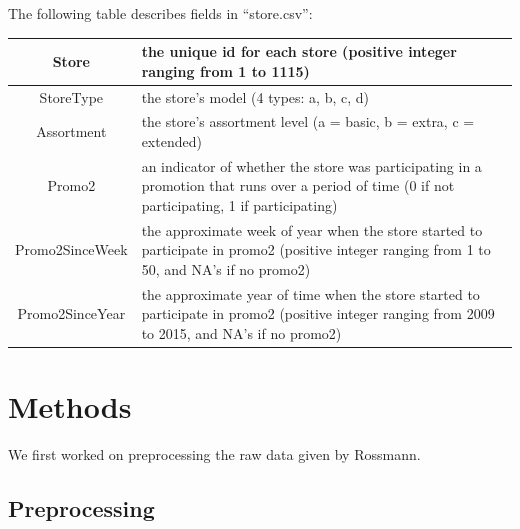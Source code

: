 \documentclass[letterpaper,twocolumn,11pt]{article}
\begin{document}
\hfill \break

The following table describes fields in ``store.csv'':

\begin{tabular}{| c | L{3.5cm} |}
  \hline
  Store & the unique id for each store (positive integer ranging from 1 to 1115) \\ \hline
  StoreType & the store's model (4 types: a, b, c, d) \\ \hline
  Assortment & the store's assortment level (a = basic, b = extra, c = extended) \\ \hline
  Promo2 & an indicator of whether the store was participating in a promotion that runs over a period of time  (0 if not participating, 1 if participating) \\ \hline
  Promo2SinceWeek & the approximate week of year when the store started to participate in promo2 (positive integer ranging from 1 to 50, and NA's if no promo2) \\ \hline
  Promo2SinceYear & the approximate year of time when the store started to participate in promo2 (positive integer ranging from 2009 to 2015, and NA's if no promo2) \\ \hline
\end{tabular}

\section{Methods}
We first worked on preprocessing the raw data given by Rossmann.

\subsection{Preprocessing}
\end{document}
